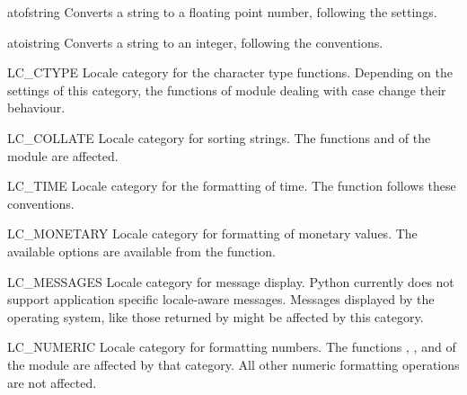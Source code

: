 \begin{funcdesc}{atof}{string}
  Converts a string to a floating point number, following the
   settings.
\end{funcdesc}

\begin{funcdesc}{atoi}{string}
  Converts a string to an integer, following the
   conventions.
\end{funcdesc}

\begin{datadesc}{LC_CTYPE}
  Locale category for the character type functions.  Depending on the
  settings of this category, the functions of module
   dealing with case change their behaviour.
\end{datadesc}

\begin{datadesc}{LC_COLLATE}
  Locale category for sorting strings.  The functions
   and  of the
   module are affected.
\end{datadesc}

\begin{datadesc}{LC_TIME}
  Locale category for the formatting of time.  The function
   follows these conventions.
\end{datadesc}

\begin{datadesc}{LC_MONETARY}
  Locale category for formatting of monetary values.  The available
  options are available from the  function.
\end{datadesc}

\begin{datadesc}{LC_MESSAGES}
  Locale category for message display. Python currently does not
  support application specific locale-aware messages.  Messages
  displayed by the operating system, like those returned by
   might be affected by this category.
\end{datadesc}

\begin{datadesc}{LC_NUMERIC}
  Locale category for formatting numbers.  The functions
  , ,  and
   of the  module are affected by that
  category.  All other numeric formatting operations are not
  affected.
\end{datadesc}

